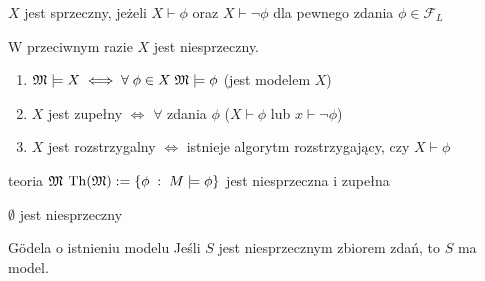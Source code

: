 \begin{definition}{}{}
  $X$ jest sprzeczny, jeżeli $X\vdash\phi$ oraz $X\vdash\neg\phi$ dla pewnego zdania $\phi\in\mathcal{F}_L$
\end{definition}

W przeciwnym razie $X$ jest niesprzeczny.

\begin{definition}{}{}
  \begin{enumerate}
    \item $\mathfrak{M}\models X\iff \forall\;\phi\in X\;\mathfrak{M}\models\phi$ (\Mm jest modelem $X$)
    \item $X$ jest zupełny $\iff$ $\forall$ zdania $\phi$ ($X\vdash \phi$ lub $x\vdash\neg\phi$)
    \item $X$ jest rozstrzygalny $\iff$ istnieje algorytm rozstrzygający, czy $X\vdash\phi$
  \end{enumerate}
\end{definition}

\begin{example}[m]
\item teoria $\mathfrak{M}$ $\operatorname{Th}(\mathfrak{M}):=\{\phi\;:\;M\models\phi\}$ jest niesprzeczna i zupełna
\item $\emptyset$ jest niesprzeczny
\end{example}

\begin{theorem}{G\"odela o istnieniu modelu}{}
  Jeśli $S$ jest niesprzecznym zbiorem zdań, to $S$ ma model.
\end{theorem}

